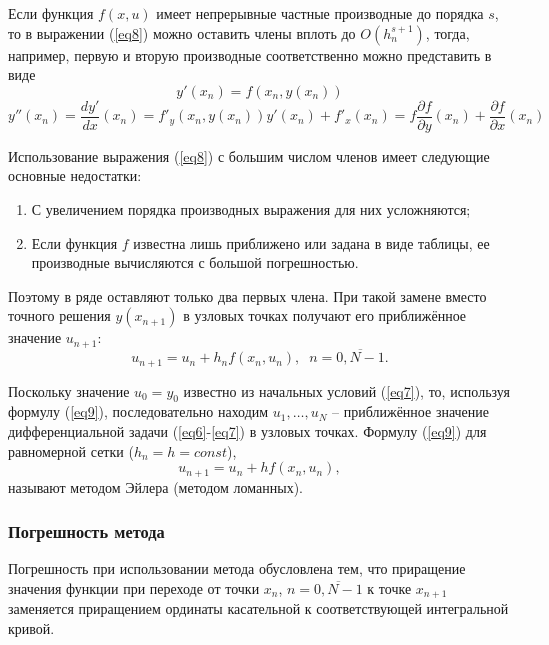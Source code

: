 \documentclass[
11pt,
master, %
subf, %
href, %
colorlinks=true, %
times, %
]{disser}
\begin{document}
Если функция $f(x,u)$ имеет непрерывные частные производные до порядка $s$, то в выражении (\ref{eq8}) можно оставить члены вплоть до $O(h_n^{s+1})$, тогда, например, первую и вторую производные соответственно можно представить в виде
$$y'(x_n) = f(x_n, y(x_n))$$
$$y''(x_n) = \frac{dy'}{dx}(x_n) = f'_y(x_n, y(x_n))y'(x_n) + f'_x(x_n) = f\frac{\partial f}{\partial y}(x_n) + \frac{\partial f}{\partial x}(x_n)$$

Использование выражения (\ref{eq8}) с большим числом членов имеет следующие основные недостатки:
\begin{enumerate}
  \item С увеличением порядка производных выражения для них усложняются;
  \item Если функция $f$ известна лишь приближено или задана в виде таблицы, ее производные вычисляются с большой погрешностью.
\end{enumerate}

Поэтому в ряде оставляют только два первых члена. При такой замене вместо точного решения $y(x_{n+1})$ в узловых точках получают его приближённое значение $u_{n+1}$:
\begin{equation}\label{eq9}
  u_{n+1} = u_n + h_n f(x_n,u_n),\;\;n=\overline{0,N-1}.
\end{equation}

Поскольку значение $u_0 = y_0$ известно из начальных условий (\ref{eq7}), то, используя формулу (\ref{eq9}), последовательно находим $u_1,\ldots,u_N$ -- приближённое значение дифференциальной задачи (\ref{eq6}-\ref{eq7}) в узловых точках. Формулу (\ref{eq9}) для равномерной сетки ($h_n = h = const$),
\begin{equation}\label{eq10}
  u_{n+1} = u_n + hf(x_n,u_n),
\end{equation}
называют методом Эйлера (методом ломанных).

\subsubsection{Погрешность метода}
Погрешность при использовании метода обусловлена тем, что приращение значения функции при переходе от точки $x_n$, $n = \overline{0,N-1}$ к точке $x_{n+1}$ заменяется приращением ординаты касательной к соответствующей интегральной кривой.
\end{document}
